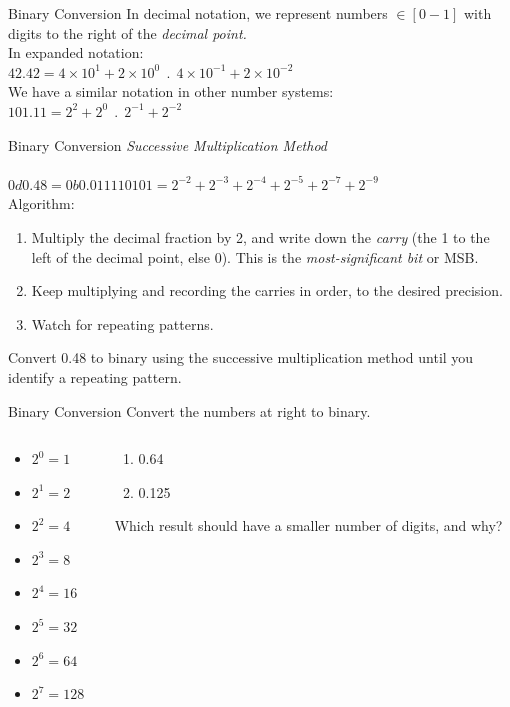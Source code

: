 \documentclass{beamer}
\begin{document}
\begin{frame}{Binary Conversion}
In decimal notation, we represent numbers $\in [0-1]$ with digits to the right of the \textit{decimal point.} \\ \vspace{0.5cm}
In expanded notation: \\
$42.42 = 4\times 10^{1} + 2\times 10^{0} ~~ . ~~ 4\times 10^{-1} + 2\times 10^{-2}$ \\ \vspace{0.5cm}
We have a similar notation in other number systems: \\
$101.11 = 2^2 + 2^0 ~~ . ~~ 2^{-1} + 2^{-2}$
\end{frame}

\begin{frame}{Binary Conversion}
\textit{Successive Multiplication Method} \\ \vspace{0.5cm} \hrulefill \\
$0d0.48 = 0b0.011110101 = 2^{-2}+2^{-3}+2^{-4}+2^{-5}+2^{-7}+2^{-9}$ \\
Algorithm:
\begin{enumerate}
\item Multiply the decimal fraction by 2, and write down the \textit{carry} (the 1 to the left of the decimal point, else 0).  This is the \textit{most-significant bit} or MSB.
\item Keep multiplying and recording the carries in order, to the desired precision.
\item Watch for repeating patterns.
\end{enumerate}
Convert 0.48 to binary using the successive multiplication method until you identify a repeating pattern.
\end{frame}

\begin{frame}{Binary Conversion}
Convert the numbers at right to binary. \\ \vspace{1cm}
\begin{columns}[T]
\begin{column}{0.5\textwidth}
\begin{itemize}
\item $2^0 = 1$
\item $2^1 = 2$
\item $2^2 = 4$
\item $2^3 = 8$
\item $2^4 = 16$
\item $2^5 = 32$
\item $2^6 = 64$
\item $2^7 = 128$
\end{itemize}
\end{column}
\begin{column}{0.5\textwidth}
\small
\begin{enumerate}
\item 0.64
\item 0.125
\end{enumerate}
Which result should have a smaller number of digits, and why?
\end{column}
\end{columns}
\end{frame}
\end{document}
